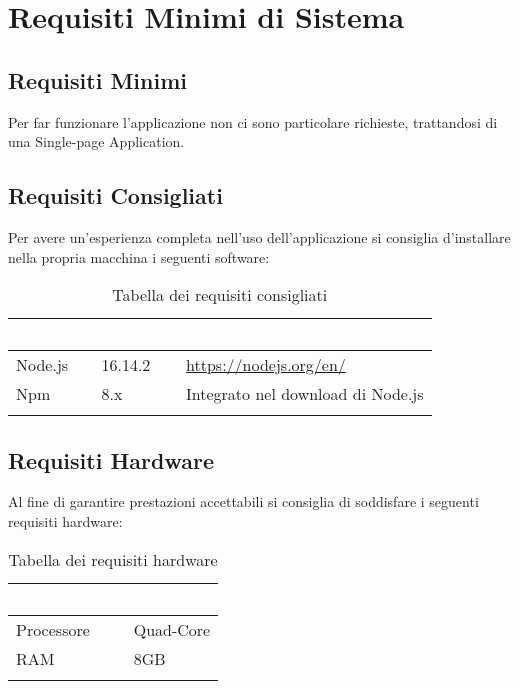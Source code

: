\chapter{Requisiti Minimi di Sistema}
\section{Requisiti Minimi}
    Per far funzionare l'applicazione non ci sono particolare richieste, trattandosi di una Single-page Application.

\section{Requisiti Consigliati}
    Per avere un'esperienza completa nell'uso dell'applicazione si consiglia d'installare nella propria macchina i seguenti software:
    \renewcommand\arraystretch{1,5}
    \begin{longtable}{|p{2cm}|p{2cm}|p{6cm}|}
        \hline
        \rowcolor[HTML]{036400}
        \textcolor{white}{\textbf{Software}} & \textcolor{white}{\textbf{Versione}} & \textcolor{white}{\textbf{Riferimenti per il download}} \\ \hline
            \rowcolor[HTML]{EFEFEF}
            Node.js & 16.14.2 & \href{https://nodejs.org/en/}{https://nodejs.org/en/}  \\ \hline
            \rowcolor[HTML]{C0C0C0}
            Npm & 8.x & Integrato nel download di Node.js \\ \hline
            \caption{Tabella dei requisiti consigliati}
    \end{longtable}
    \renewcommand\arraystretch{1}

\section{Requisiti Hardware}
    Al fine di garantire prestazioni accettabili si consiglia di soddisfare i seguenti requisiti hardware:
    \renewcommand\arraystretch{1,5}
    \begin{longtable}{|p{3cm}|p{3cm}|}
        \hline
        \rowcolor[HTML]{036400}
        \textcolor{white}{\textbf{Componente}} & \textcolor{white}{\textbf{Versione}} \\ \hline
            \rowcolor[HTML]{EFEFEF}
            Processore & Quad-Core \\ \hline
            \rowcolor[HTML]{C0C0C0}
            RAM & 8GB \\ \hline
            \caption{Tabella dei requisiti hardware}
    \end{longtable}
    \renewcommand\arraystretch{1}

